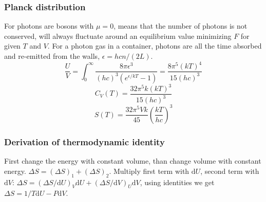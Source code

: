 \documentclass[a4paper, norsk, 8pt]{article}
\begin{document}
\begin{multicols*}{3}
\subsubsection*{\scriptsize Planck distribution}
For photons are bosons with $\mu=0$, means that the number of photons is not conserved, will always
fluctuate around an equilibrium value minimizing $F$ for given $T$ and $V$. For a photon
gas in a container, photons are all the time absorbed and re-emitted from the walls, $\epsilon = hcn/(2L)$.
$$ \frac{U}{V} = \int_0^{\infty} \frac{8\pi\epsilon^3}{(hc)^3(e^{\epsilon/kT}-1)} = \frac{8\pi^5(kT)^4}{15(hc)^3}$$
$$ C_V(T) =  \frac{32\pi^5k(kT)^3}{15(hc)^3}$$
$$ S(T) =  \frac{32\pi^5Vk}{45} \left( \frac{kT}{hc} \right)^3 $$

\subsubsection*{\scriptsize Derivation of thermodynamic identity}
First change the energy with constant volume, than change volume with constant energy. $\Delta S = (\Delta S)_1 + (\Delta S)_2$. Multiply first term with $\mbox{d}U$, second term with $\mbox{d}V$: $\Delta S = (\Delta S/\mbox{d}U)_V\mbox{d}U + (\Delta S/\mbox{d}V)_U\mbox{d}V$, using identities we get $\Delta S = 1/T\mbox{d}U - P\mbox{d}V$.



\end{multicols*}
\end{document}

